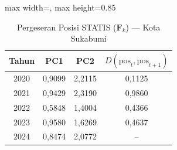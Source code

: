 \begin{table}[H]
\centering
\caption{Pergeseran Posisi STATIS ($\mathbf{F}_k$) --- Kota Sukabumi} \label{tab:app2jarak_statis_skor_kota_sukabumi}
\begin{adjustbox}{max width=\textwidth, max height=0.85\textheight}
\begin{tabular}{|c|c|c|c|}
\hline
\textbf{Tahun} & \textbf{PC1} & \textbf{PC2} & \textbf{$D(\text{pos}_t, \text{pos}_{t+1})$} \\
\hline
2020 & 0,9099 & 2,2115 & 0,1125 \\
2021 & 0,9429 & 2,3190 & 0,9860 \\
2022 & 0,5848 & 1,4004 & 0,4366 \\
2023 & 0,9580 & 1,6269 & 0,4637 \\
2024 & 0,8474 & 2,0772 & -- \\
\hline
\end{tabular}
\end{adjustbox}
\end{table}